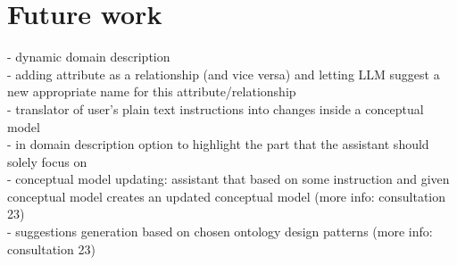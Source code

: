 \chapter{Future work}

- dynamic domain description \\

- adding attribute as a relationship (and vice versa) and letting LLM suggest a new appropriate name for this attribute/relationship \\

- translator of user's plain text instructions into changes inside a conceptual model \\

- in domain description option to highlight the part that the assistant should solely focus on \\

- conceptual model updating: assistant that based on some instruction and given conceptual model creates an updated conceptual model (more info: consultation 23) \\

- suggestions generation based on chosen ontology design patterns (more info: consultation 23) \\

